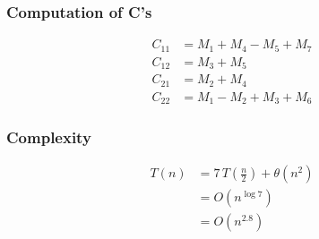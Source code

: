 \documentclass{article}
\theoremstyle{definition}
\theoremstyle{remark}
\theoremstyle{plain}
\begin{document}
\subsubsection{Computation of C's}
\begin{equation*}
	\begin{split}
		C_{11} & = M_1 + M_4 - M_5 + M_7\\
		C_{12} & = M_3 + M_5\\
		C_{21} & = M_2 + M_4\\
		C_{22} & = M_1 - M_2 + M_3 + M_6
	\end{split}
\end{equation*}

\subsubsection{Complexity}
\begin{equation*}
	\begin{split}
		T(n) &= 7\, T(\frac{n}{2}) + \theta(n^2)\\
		& = O(n^{\log 7})\\
		& = O(n^{2.8})
	\end{split}
\end{equation*}
	
\end{document}
